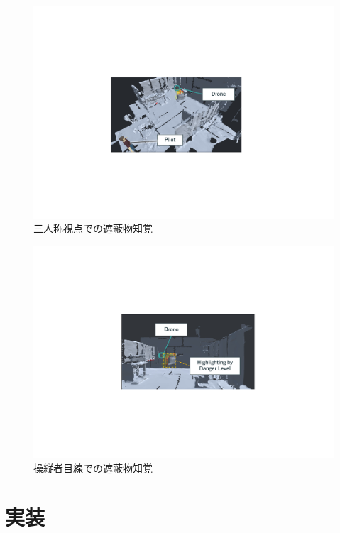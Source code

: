\documentclass[a4paper,11pt]{ujreport}
\begin{document}
\begin{figure}[!tb]
  \centering
  \includegraphics[width=0.9\linewidth]{img/03_danger1.pdf}
  \caption{三人称視点での遮蔽物知覚}
  \label{fig:03_dangerLevel1}
\end{figure}
\begin{figure}[!tb]
  \centering
  \includegraphics[width=0.9\linewidth]{img/03_danger2.pdf}
  \caption{操縦者目線での遮蔽物知覚}
  \label{fig:03_dangerLevel2}
\end{figure}

\chapter{実装}
\label{chap:Development}

\end{document}

